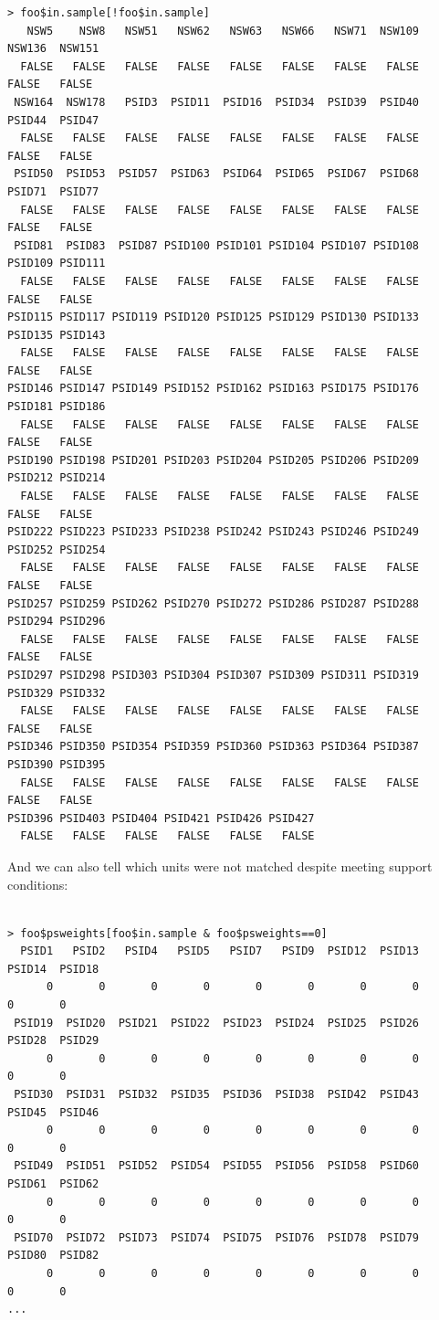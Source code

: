\documentclass[oneside,letterpaper,titlepage]{article}
\begin{document}
\begin{verbatim}
> foo$in.sample[!foo$in.sample]
   NSW5    NSW8   NSW51   NSW62   NSW63   NSW66   NSW71  NSW109  NSW136  NSW151
  FALSE   FALSE   FALSE   FALSE   FALSE   FALSE   FALSE   FALSE   FALSE   FALSE
 NSW164  NSW178   PSID3  PSID11  PSID16  PSID34  PSID39  PSID40  PSID44  PSID47
  FALSE   FALSE   FALSE   FALSE   FALSE   FALSE   FALSE   FALSE   FALSE   FALSE
 PSID50  PSID53  PSID57  PSID63  PSID64  PSID65  PSID67  PSID68  PSID71  PSID77
  FALSE   FALSE   FALSE   FALSE   FALSE   FALSE   FALSE   FALSE   FALSE   FALSE
 PSID81  PSID83  PSID87 PSID100 PSID101 PSID104 PSID107 PSID108 PSID109 PSID111
  FALSE   FALSE   FALSE   FALSE   FALSE   FALSE   FALSE   FALSE   FALSE   FALSE
PSID115 PSID117 PSID119 PSID120 PSID125 PSID129 PSID130 PSID133 PSID135 PSID143
  FALSE   FALSE   FALSE   FALSE   FALSE   FALSE   FALSE   FALSE   FALSE   FALSE
PSID146 PSID147 PSID149 PSID152 PSID162 PSID163 PSID175 PSID176 PSID181 PSID186
  FALSE   FALSE   FALSE   FALSE   FALSE   FALSE   FALSE   FALSE   FALSE   FALSE
PSID190 PSID198 PSID201 PSID203 PSID204 PSID205 PSID206 PSID209 PSID212 PSID214
  FALSE   FALSE   FALSE   FALSE   FALSE   FALSE   FALSE   FALSE   FALSE   FALSE
PSID222 PSID223 PSID233 PSID238 PSID242 PSID243 PSID246 PSID249 PSID252 PSID254
  FALSE   FALSE   FALSE   FALSE   FALSE   FALSE   FALSE   FALSE   FALSE   FALSE
PSID257 PSID259 PSID262 PSID270 PSID272 PSID286 PSID287 PSID288 PSID294 PSID296
  FALSE   FALSE   FALSE   FALSE   FALSE   FALSE   FALSE   FALSE   FALSE   FALSE
PSID297 PSID298 PSID303 PSID304 PSID307 PSID309 PSID311 PSID319 PSID329 PSID332
  FALSE   FALSE   FALSE   FALSE   FALSE   FALSE   FALSE   FALSE   FALSE   FALSE
PSID346 PSID350 PSID354 PSID359 PSID360 PSID363 PSID364 PSID387 PSID390 PSID395
  FALSE   FALSE   FALSE   FALSE   FALSE   FALSE   FALSE   FALSE   FALSE   FALSE
PSID396 PSID403 PSID404 PSID421 PSID426 PSID427
  FALSE   FALSE   FALSE   FALSE   FALSE   FALSE
\end{verbatim}

And we can also tell which units were not matched despite meeting
support conditions:

\begin{verbatim}

> foo$psweights[foo$in.sample & foo$psweights==0]
  PSID1   PSID2   PSID4   PSID5   PSID7   PSID9  PSID12  PSID13  PSID14  PSID18
      0       0       0       0       0       0       0       0       0       0
 PSID19  PSID20  PSID21  PSID22  PSID23  PSID24  PSID25  PSID26  PSID28  PSID29
      0       0       0       0       0       0       0       0       0       0
 PSID30  PSID31  PSID32  PSID35  PSID36  PSID38  PSID42  PSID43  PSID45  PSID46
      0       0       0       0       0       0       0       0       0       0
 PSID49  PSID51  PSID52  PSID54  PSID55  PSID56  PSID58  PSID60  PSID61  PSID62
      0       0       0       0       0       0       0       0       0       0
 PSID70  PSID72  PSID73  PSID74  PSID75  PSID76  PSID78  PSID79  PSID80  PSID82
      0       0       0       0       0       0       0       0       0       0
...
\end{verbatim}
\end{document}
